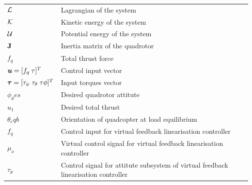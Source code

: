 \begin{table}[H]
\begin{tabular}{@{}p{}p{}@{}}
        $\mathcal{L}$ & Lagrangian of the system \\
        $\mathcal{K}$ & Kinetic energy of the system \\
        $\mathcal{U}$ & Potential energy of the system \\
        $\mathbf{J}$ & Inertia matrix of the quadrotor \\
        $f_q$ & Total thrust force \\
        $\boldsymbol{u} = [f_q \; \tau]^T$ & Control input vector \\
        $\boldsymbol{\tau} = [\tau_\psi \; \tau_\theta \; \tau\phi]^T$ & Input torques vector \\
        $\phi_des$ & Desired quadrotor attitute \\
        $u_1$ & Desired total thrust \\
        $\theta_eqb$ & Orientation of quadcopter at load equilibrium \\
        $f_q$ & Control input for virtual feedback linearisation controller \\
        $\mu_x$ & Virtual control signal for virtual feedback linearisation controller \\
        $\tau_\theta$ & Control signal for attitute subsystem of virtual feedback linearisation controller \\
        \hline
    \end{tabular}
    \label{tab:symbols}
\end{table}

